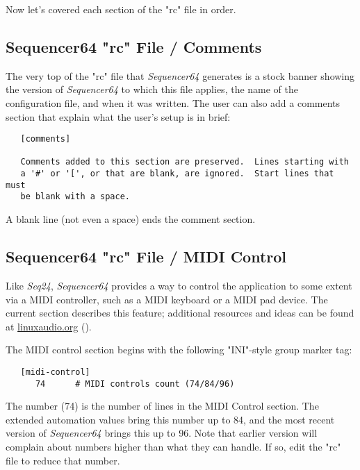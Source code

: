    Now let's covered each section of the "rc" file in order.

\subsection{Sequencer64 "rc" File / Comments}
\label{subsec:seq64_rc_file_midi_comments}

   The very top of the "rc" file that \textsl{Sequencer64} generates is a stock
   banner showing the version of \textsl{Sequencer64} to which this file
   applies, the name of the configuration file, and when it was written.  The
   user can also add a comments section that explain what the user's setup is
   in brief:

   \begin{verbatim}
   [comments]

   Comments added to this section are preserved.  Lines starting with
   a '#' or '[', or that are blank, are ignored.  Start lines that must
   be blank with a space.
   \end{verbatim}

   A blank line (not even a space) ends the comment section.

\subsection{Sequencer64 "rc" File / MIDI Control}
\label{subsec:seq64_rc_file_midi_control}

   Like \textsl{Seq24}, \textsl{Sequencer64} provides a way to control the
   application to some extent via a MIDI controller, such as a MIDI keyboard or
   a MIDI pad device.  The current section describes this feature;
   additional resources and ideas can be found at \url{linuxaudio.org}
   (\cite{midicontrol}).

   The MIDI control section begins with the following "INI"-style
   group marker tag:

   \begin{verbatim}
   [midi-control]
      74      # MIDI controls count (74/84/96)
   \end{verbatim}

   The number (74) is the number of lines in the MIDI Control section.
   The extended automation values bring this number up to 84, and the most recent
   version of \textsl{Sequencer64} brings this up to 96.  Note that earlier version
   will complain about numbers higher than what they can handle.
   If so, edit the "rc" file to reduce that number.

